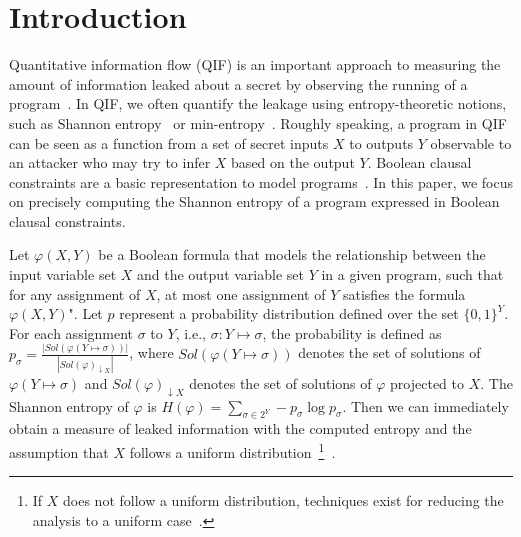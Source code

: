 \section{Introduction}
\label{sec:Intro}

Quantitative information flow (QIF) is an important approach to measuring the amount of information leaked about a secret by observing the running of a program~\cite{denning1982cryptography, gray1992toward}.
In QIF, we often quantify the leakage using entropy-theoretic notions, such as Shannon entropy~\cite{backes2009automatic, cerny2011complexity, phan2012symbolic, smith2009foundations} or
min-entropy~\cite{backes2009automatic, meng2011calculating, phan2012symbolic, smith2009foundations}.
Roughly speaking, a program in QIF can be seen as a function from a set of secret inputs $X$ to outputs $Y$ observable to an attacker who may try to infer $X$ based on the output $Y$.
Boolean clausal constraints are a basic representation to model programs~\cite{fremont2017maximum, golia2022scalable}. 
In this paper, we focus on precisely computing the Shannon entropy of a program expressed in Boolean clausal constraints.


Let $\varphi(X,Y)$ be a Boolean formula that models the relationship between the input variable set $X$ and the output variable set $Y$ in a given program, such that for any assignment of $X$, at most one assignment of $Y$ satisfies the formula $\varphi(X,Y)$".
Let $p$ represent a probability distribution defined over the set $\{0,1\}^Y$.
For each assignment $\sigma$ to $Y$, i.e., $\sigma:Y \mapsto \sigma$, the probability is defined as $p_{\sigma} = \frac{\left| \mathit{Sol}(\varphi(Y \mapsto \sigma)) \right|}{ \left| \mathit{Sol}(\varphi)_{\downarrow X} \right| }$, where $\mathit{Sol}(\varphi(Y \mapsto \sigma))$ denotes the set of solutions of $\varphi(Y \mapsto \sigma)$ and $\mathit{Sol}(\varphi)_{\downarrow X}$ denotes the set of solutions of $\varphi$ projected to $X$.
The Shannon entropy of $\varphi$ is $H(\varphi) = \sum_{\sigma \in 2^Y} -p_{\sigma} \log p_{\sigma} $.
Then we can immediately obtain a measure of leaked information with the computed entropy and the assumption that $X$ follows a uniform distribution~\footnote{If $X$ does not follow a uniform distribution, techniques exist for reducing the analysis to a uniform case~\cite{backes2011non}.}~\cite{klebanov2013sat}. 

